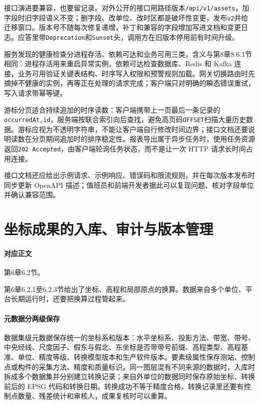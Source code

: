 接口演进要兼容，也要留记录。对外公开的接口用路径版本\texttt{/api/v1/assets}，加字段时旧字段语义不变；删字段、改单位、改时区都是破坏性变更，发布\texttt{v2}并给迁移窗口。版本号不随每次修复递增，补丁和兼容的字段增加写进文档和变更日志。应答里带\texttt{Deprecation}和\texttt{Sunset}头，调用方在旧版本停用前有时间升级。

服务发现的健康检查分进程存活、依赖可达和业务可用三类，含义与第8章8.6.1节相同：进程存活用来重启异常实例，依赖可达检查数据库、Redis 和 Kafka 连接，业务可用验证关键表结构、时序写入权限和预警规则加载。网关切换路由时先摘掉不健康的实例，再等正在处理的请求完成；客户端只对明确的瞬态错误重试，写入请求带幂等键。


游标分页适合持续追加的时序读数：客户端携带上一页最后一条记录的\texttt{occurredAt,id}，服务端按联合索引向后查找，避免高页码\texttt{OFFSET}扫描大量历史数据。游标应视为不透明字符串，不能让客户端自行修改时间边界；接口文档还要说明读数在分页期间追加时的排序稳定性。报表导出属于异步任务时，使用任务资源返回\texttt{202 Accepted}，由客户端轮询任务状态，而不是让一次 HTTP 请求长时间占用连接。

接口文档还应给出示例请求、示例响应、错误码和限流规则，并在每次版本发布时同步更新 OpenAPI 描述；值班员和前端开发者据此可以复现问题、核对字段单位并确认兼容范围。

\section{坐标成果的入库、审计与版本管理}\label{app:ext-ch06-crs-audit}\label{online:ch06-crs}

\paragraph{对应正文}第6章6.2节。

第6章6.2.1至6.2.3节给出了坐标、高程和局部原点的换算。数据来自多个单位、平台长期运行时，还要把换算过程管起来。

\paragraph{元数据分两级保存}数据集级元数据保存统一的坐标系和版本：水平坐标系、投影方法、带宽、带号、中央经线、尺度因子、假东与假北、东坐标是否带带号前缀、高程类型、高程基准、单位、精度等级、转换模型版本和生产软件版本。要素级属性保存测站、控制点或构件的采集方法、精度和质量标识。同一图层混有不同来源的数据时，入库时拆成多个数据集并分别建立转换记录；来自外单位的数据同时保存原始坐标、转换前后的 EPSG 代码和转换日期。转换成功不等于精度合格，转换记录里还要有控制点数量、残差统计和审核人，成果复核时可以重算。

